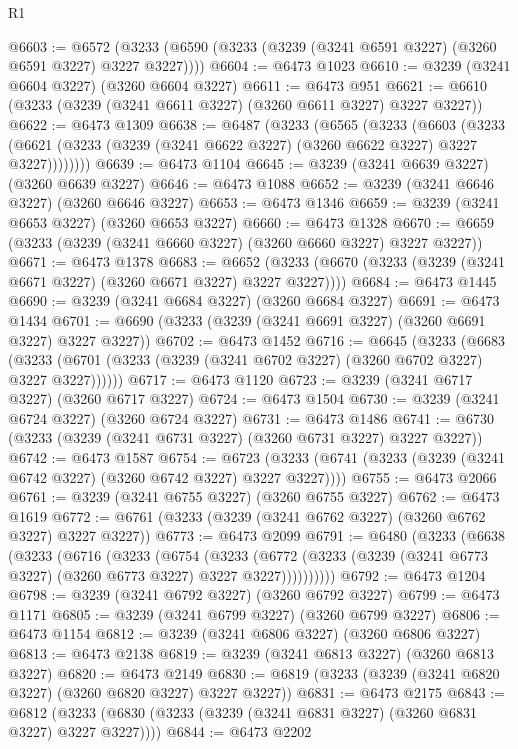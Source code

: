 \begin{lexlean}{R1}
\begin{coremodule}
@6603 := @6572 (@3233 (@6590 (@3233 (@3239 (@3241 @6591 @3227) (@3260 @6591 @3227) @3227 @3227))))
@6604 := @6473 @1023
@6610 := @3239 (@3241 @6604 @3227) (@3260 @6604 @3227)
@6611 := @6473 @951
@6621 := @6610 (@3233 (@3239 (@3241 @6611 @3227) (@3260 @6611 @3227) @3227 @3227))
@6622 := @6473 @1309
@6638 := @6487
    (@3233
      (@6565
        (@3233
          (@6603
            (@3233 (@6621 (@3233 (@3239 (@3241 @6622 @3227) (@3260 @6622 @3227) @3227 @3227))))))))
@6639 := @6473 @1104
@6645 := @3239 (@3241 @6639 @3227) (@3260 @6639 @3227)
@6646 := @6473 @1088
@6652 := @3239 (@3241 @6646 @3227) (@3260 @6646 @3227)
@6653 := @6473 @1346
@6659 := @3239 (@3241 @6653 @3227) (@3260 @6653 @3227)
@6660 := @6473 @1328
@6670 := @6659 (@3233 (@3239 (@3241 @6660 @3227) (@3260 @6660 @3227) @3227 @3227))
@6671 := @6473 @1378
@6683 := @6652 (@3233 (@6670 (@3233 (@3239 (@3241 @6671 @3227) (@3260 @6671 @3227) @3227 @3227))))
@6684 := @6473 @1445
@6690 := @3239 (@3241 @6684 @3227) (@3260 @6684 @3227)
@6691 := @6473 @1434
@6701 := @6690 (@3233 (@3239 (@3241 @6691 @3227) (@3260 @6691 @3227) @3227 @3227))
@6702 := @6473 @1452
@6716 := @6645
    (@3233
      (@6683 (@3233 (@6701 (@3233 (@3239 (@3241 @6702 @3227) (@3260 @6702 @3227) @3227 @3227))))))
@6717 := @6473 @1120
@6723 := @3239 (@3241 @6717 @3227) (@3260 @6717 @3227)
@6724 := @6473 @1504
@6730 := @3239 (@3241 @6724 @3227) (@3260 @6724 @3227)
@6731 := @6473 @1486
@6741 := @6730 (@3233 (@3239 (@3241 @6731 @3227) (@3260 @6731 @3227) @3227 @3227))
@6742 := @6473 @1587
@6754 := @6723 (@3233 (@6741 (@3233 (@3239 (@3241 @6742 @3227) (@3260 @6742 @3227) @3227 @3227))))
@6755 := @6473 @2066
@6761 := @3239 (@3241 @6755 @3227) (@3260 @6755 @3227)
@6762 := @6473 @1619
@6772 := @6761 (@3233 (@3239 (@3241 @6762 @3227) (@3260 @6762 @3227) @3227 @3227))
@6773 := @6473 @2099
@6791 := @6480
    (@3233
      (@6638
        (@3233
          (@6716
            (@3233
              (@6754
                (@3233
                  (@6772 (@3233 (@3239 (@3241 @6773 @3227) (@3260 @6773 @3227) @3227 @3227))))))))))
@6792 := @6473 @1204
@6798 := @3239 (@3241 @6792 @3227) (@3260 @6792 @3227)
@6799 := @6473 @1171
@6805 := @3239 (@3241 @6799 @3227) (@3260 @6799 @3227)
@6806 := @6473 @1154
@6812 := @3239 (@3241 @6806 @3227) (@3260 @6806 @3227)
@6813 := @6473 @2138
@6819 := @3239 (@3241 @6813 @3227) (@3260 @6813 @3227)
@6820 := @6473 @2149
@6830 := @6819 (@3233 (@3239 (@3241 @6820 @3227) (@3260 @6820 @3227) @3227 @3227))
@6831 := @6473 @2175
@6843 := @6812 (@3233 (@6830 (@3233 (@3239 (@3241 @6831 @3227) (@3260 @6831 @3227) @3227 @3227))))
@6844 := @6473 @2202

\end{coremodule}
\end{lexlean}
